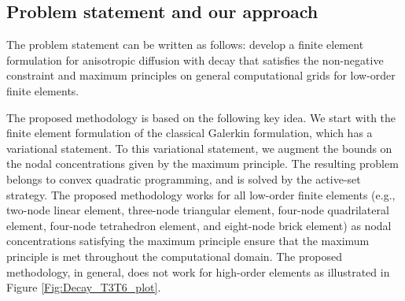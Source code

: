 \documentclass[11pt]{amsart}
\begin{document}
\subsection{Problem statement and our approach}
The problem statement can be written as follows: develop a finite element formulation 
for anisotropic diffusion with decay that satisfies the non-negative constraint and 
maximum principles on general computational grids for low-order finite elements. 

The proposed methodology is based on the following key idea. We start with the finite 
element formulation of the classical Galerkin formulation, which has a variational 
statement. To this variational statement, we augment the bounds on the nodal concentrations 
given by the maximum principle. The resulting problem belongs to convex quadratic programming, 
and is solved by the active-set strategy. The proposed methodology works for all low-order 
finite elements (e.g., two-node linear element, three-node triangular element, four-node 
quadrilateral element, four-node tetrahedron element, and eight-node brick element) as 
nodal concentrations satisfying the maximum principle ensure that the maximum principle 
is met throughout the computational domain. The proposed methodology, in general, does 
not work for high-order elements as illustrated in Figure \ref{Fig:Decay_T3T6_plot}.
 
\end{document}
